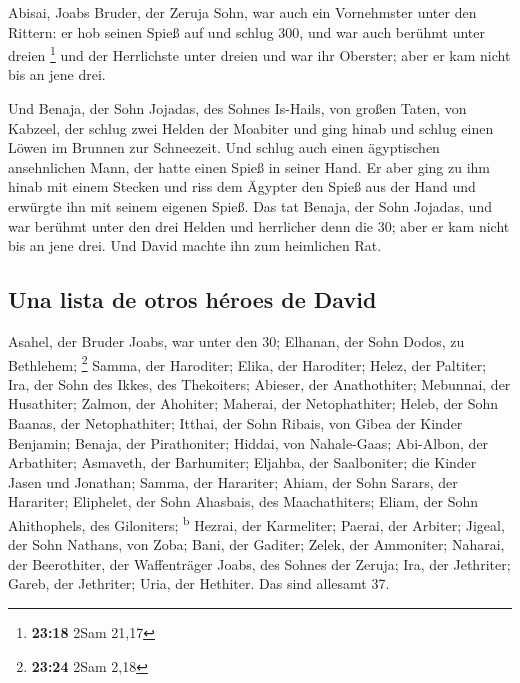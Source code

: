  Abisai, Joabs Bruder, der Zeruja Sohn, war auch ein
Vornehmster unter den Rittern: er hob seinen Spieß auf und schlug 300,
und war auch berühmt unter dreien \footnote{\textbf{23:18} 2Sam 21,17}
 und der Herrlichste unter dreien und war ihr Oberster;
aber er kam nicht bis an jene drei.

 Und Benaja, der Sohn Jojadas, des Sohnes Is-Hails, von
großen Taten, von Kabzeel, der schlug zwei Helden der Moabiter und ging
hinab und schlug einen Löwen im Brunnen zur Schneezeit. 
Und schlug auch einen ägyptischen ansehnlichen Mann, der hatte einen
Spieß in seiner Hand. Er aber ging zu ihm hinab mit einem Stecken und
riss dem Ägypter den Spieß aus der Hand und erwürgte ihn mit seinem
eigenen Spieß.  Das tat Benaja, der Sohn Jojadas, und war
berühmt unter den drei Helden  und herrlicher denn die
30; aber er kam nicht bis an jene drei. Und David machte ihn zum
heimlichen Rat.

\hypertarget{una-lista-de-otros-huxe9roes-de-david}{%
\subsection{Una lista de otros héroes de
David}\label{una-lista-de-otros-huxe9roes-de-david}}

 Asahel, der Bruder Joabs, war unter den 30; Elhanan, der
Sohn Dodos, zu Bethlehem; \footnote{\textbf{23:24} 2Sam 2,18}
 Samma, der Haroditer; Elika, der Haroditer;
 Helez, der Paltiter; Ira, der Sohn des Ikkes, des
Thekoiters;  Abieser, der Anathothiter; Mebunnai, der
Husathiter;  Zalmon, der Ahohiter; Maherai, der
Netophathiter;  Heleb, der Sohn Baanas, der
Netophathiter; Itthai, der Sohn Ribais, von Gibea der Kinder Benjamin;
 Benaja, der Pirathoniter; Hiddai, von Nahale-Gaas;
 Abi-Albon, der Arbathiter; Asmaveth, der Barhumiter;
 Eljahba, der Saalboniter; die Kinder Jasen und Jonathan;
 Samma, der Harariter; Ahiam, der Sohn Sarars, der
Harariter;  Eliphelet, der Sohn Ahasbais, des
Maachathiters; Eliam, der Sohn Ahithophels, des Giloniters;
\textsuperscript{b}  Hezrai, der Karmeliter; Paerai, der
Arbiter;  Jigeal, der Sohn Nathans, von Zoba; Bani, der
Gaditer;  Zelek, der Ammoniter; Naharai, der Beerothiter,
der Waffenträger Joabs, des Sohnes der Zeruja;  Ira, der
Jethriter; Gareb, der Jethriter;  Uria, der Hethiter. Das
sind allesamt 37.


